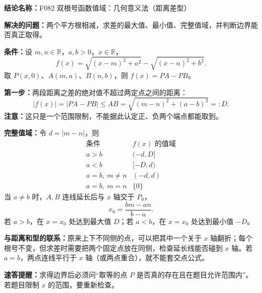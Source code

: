 \textbf{结论名称：}F082 双根号函数值域：几何意义法（距离差型）

\textbf{解决的问题：}两个平方根相减，求差的最大值、最小值、完整值域，并判断边界能否真正取得。

\textbf{条件：}设 $m,n\in\mathbb R$，$a,b>0$，$x\in\mathbb R$，
\[
 f(x)=\sqrt{(x-m)^2+a^2}-\sqrt{(x-n)^2+b^2}.
\]
取 $P(x,0)$、$A(m,a)$、$B(n,b)$，则 $f(x)=PA-PB$。

\textbf{第一步：}两段距离之差的绝对值不超过两定点之间的距离：
\[
 |f(x)|=|PA-PB|\leq AB
 =\sqrt{(m-n)^2+(a-b)^2}=:D.
\]
\textbf{注意：}这只是一个范围限制，不能据此认定正、负两个端点都能取到。

\textbf{完整值域：}令 $d=|m-n|$，则
\[
 \boxed{
 \begin{array}{c|c}
 \text{条件}& f(x)\text{ 的值域}\\\hline
 a>b&(-d,D]\\
 a<b&[-D,d)\\
 a=b,\ m\ne n&(-d,d)\\
 a=b,\ m=n&\{0\}
 \end{array}}
\]
当 $a\ne b$ 时，$A,B$ 连线延长后与 $x$ 轴交于 $P_0$，
\[
 \boxed{x_0=\frac{bm-an}{b-a}}.
\]
若 $a>b$，在 $x=x_0$ 处达到最大值 $D$；若 $a<b$，在 $x=x_0$ 处达到最小值 $-D$。

\textbf{与距离和型的联系：}原来上下不同侧的点，可以把其中一个关于 $x$ 轴翻折；每个根号不变，但求差时需要把两个固定点放在同侧，检查延长线能否碰到 $x$ 轴。若 $a=b$，两点连线平行于 $x$ 轴（或两点重合），就不能套交点公式。

\textbf{速答提醒：}求得边界后必须问“取等的点 $P$ 是否真的存在且在题目允许范围内”。若题目限制 $x$ 的范围，要重新检查。
